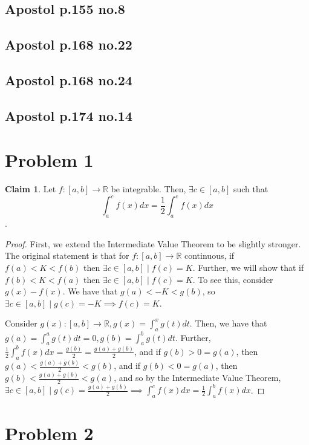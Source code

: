 \documentclass[12pt,letterpaper]{article}
\theoremstyle{definition}
\newtheorem*{claim}{Claim}
\newcommand{\R}{\mathbb{R}}
\begin{document}
\subsection*{Apostol p.155 no.8}
\subsection*{Apostol p.168 no.22}
\subsection*{Apostol p.168 no.24}
\subsection*{Apostol p.174 no.14}

\section*{Problem 1}

\begin{claim}
  Let $f: [a,b] \rightarrow \R$ be integrable. Then, $\exists c \in [a,b]$ such
  that
  \[
    \int_a^cf(x)dx = \frac{1}{2}\int_a^cf(x)dx
  \].
\end{claim}

\begin{proof}

  First, we extend the Intermediate Value Theorem to be slightly stronger. The
  original statement is that for
  $f: [a,b] \rightarrow \R$ continuous, if $f(a) < K < f(b)$ then $\exists c \in
  [a,b] \mid f(c) = K$. Further, we will show that if $f(b) < K < f(a)$ then
  $\exists c \in [a,b] \mid f(c) = K$. To see this, consider $g(x) -f(x)$. We
  have that $g(a) < -K < g(b)$, so $\exists c \in [a,b] \mid g(c) = -K \implies
  f(c) = K$.
  
  Consider $g(x) : [a,b] \rightarrow \R, g(x) = \int_a^xg(t)dt$. Then, we have
  that $g(a) = \int_a^ag(t)dt = 0, g(b) = \int_a^bg(t)dt$. Further, $\frac{1}{2}
  \int_a^bf(x)dx = \frac{g(b)}{2} = \frac{g(a) + g(b)}{2}$, and if $g(b) > 0 = g(a)$, then $g(a) <
  \frac{g(a) + g(b)}{2} < g(b)$, and if $g(b) < 0 = g(a)$, then $g(b) <
  \frac{g(a) + g(b)}{2} < g(a)$, and so by the Intermediate Value Theorem,
  $\exists c \in [a,b] \mid g(c) = \frac{g(a) + g(b)}{2} \implies \int_a^cf(x)dx
    = \frac{1}{2}\int_a^bf(x)dx$.
\end{proof}

\section*{Problem 2}
\end{document}
